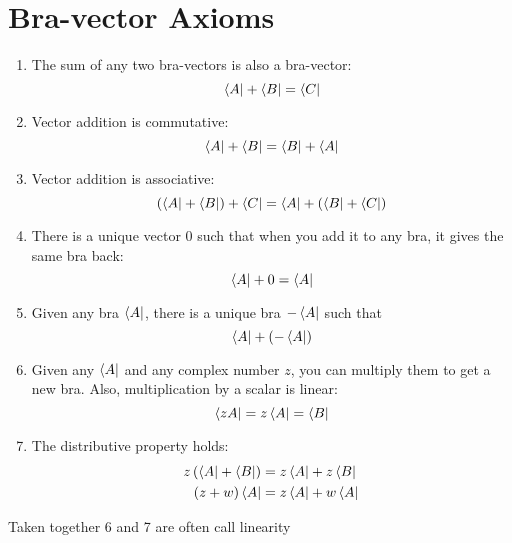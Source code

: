 \documentclass[12pt,a5paper]{article}
\begin{document}
\section{Bra-vector Axioms}
\begin{enumerate}
    \item The sum of any two bra-vectors is also a bra-vector:
    \begin{equation}
        \bra{A}  + \bra{B} = \bra{C}
    \end{equation}
    \item Vector addition is commutative:
    \begin{equation}
        \bra{ A } +\bra{ B } =\bra{B} +\bra{A}
    \end{equation}
    \item Vector addition is associative:
    \begin{equation}
        \left(\bra{ A } +\bra{ B }\right)+\bra{ C } =\bra{ A } +  \left(\bra{B }+\bra{ C }\right)
    \end{equation}
    \item There is a unique vector $0$ such that when you add it to any bra, it gives the same bra back:
    \begin{equation}
       \bra{ A } + 0 =\bra{ A }
    \end{equation}
    \item Given any bra $\bra{A}$, there is a unique bra $-\bra{A}$ such that
    \begin{equation}
       \bra{A} + \left( -\bra{A} \right)
    \end{equation}
    \item Given any $\bra{A}$ and any complex number $z$, you can multiply them to get a new bra. Also, multiplication by a scalar is linear:
    \begin{equation}
       \bra{zA} = z\bra{ A } =\bra{B}
    \end{equation}
    \item The distributive property holds:
    \begin{align}
        z\left(\bra{A} +\bra{B}\right) &=  z\bra{A} + z\bra{B}\\
        \left( z+w\right)\bra{A} &= z\bra{A} + w\bra{A}
    \end{align}
\end{enumerate}
Taken together 6 and 7 are often call linearity
\end{document}
